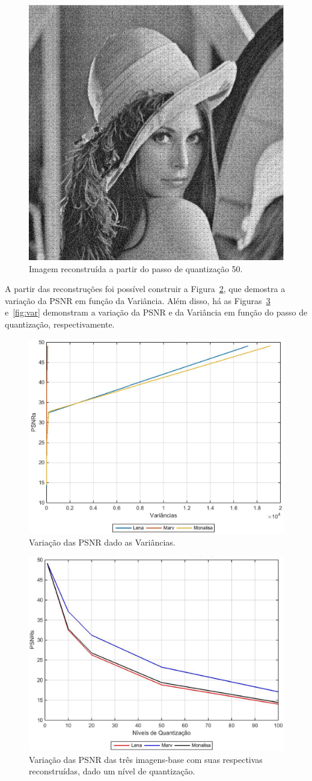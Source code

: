 \documentclass[conference]{Trabalho_3}
\begin{document}
\begin{figure}[!t]
  \centering
  \includegraphics[width = 5 cm]{lena_50}
  \caption{Imagem reconstru\'ida a partir do passo de quantiza\c{c}\~ao 50.}
  \label{fig:lena50}
\end{figure}

A partir das reconstru\c{c}\~oes foi poss\'ivel construir a Figura~\ref{fig:psnrxvar}, que demostra a varia\c{c}\~ao da PSNR em fun\c{c}\~ao da Vari\^ancia. Al\'em disso, h\'a as Figuras~\ref{fig:psnr} e~\ref{fig:var} demonstram a varia\c{c}\~ao da PSNR e da Vari\^ancia em fun\c{c}\~ao do passo de quantiza\c{c}\~ao, respectivamente.

\begin{figure}[!t]
  \centering
  \includegraphics[width = 6.5 cm]{psnrxvar}
  \caption{Varia\c{c}\~ao das PSNR dado as Vari\^ancias.}
  \label{fig:psnrxvar}
\end{figure}

\begin{figure}[!t]
  \centering
  \includegraphics[width = 6.5 cm]{psnr}
  \caption{Varia\c{c}\~ao das PSNR das tr\^es imagens-base com suas respectivas reconstru\'idas, dado um n\'ivel de quantiza\c{c}\~ao.}
  \label{fig:psnr}
\end{figure}
\end{document}
